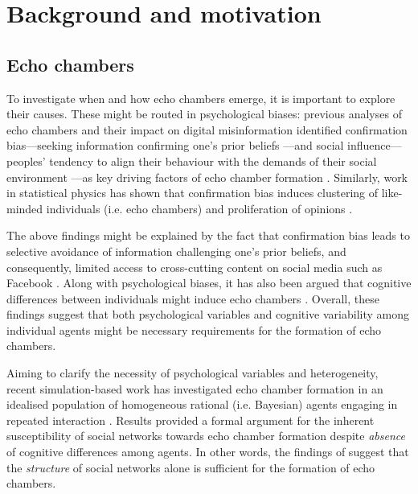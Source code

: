 \documentclass[fleqn,10pt]{wlscirep}
\begin{document}
\section*{Background and motivation}
\subsection*{Echo chambers}
To investigate when and how echo chambers emerge, it is important to explore their causes. These might be routed in psychological biases: previous analyses of echo chambers and their impact on digital misinformation identified confirmation bias---seeking information confirming one's prior beliefs \cite{nickerson1998confirmation}---and social influence---peoples' tendency to align their behaviour with the demands of their social environment \cite{kelman1958compliance}---as key driving factors of echo chamber formation
\cite{del2016spreading, starnini2016emergence, sikder2020minimalistic}. Similarly, work in statistical physics has shown that confirmation bias induces clustering of like-minded individuals (i.e. echo chambers) and proliferation of opinions \cite{ngampruetikorn2016bias}. 

The above findings might be explained by the fact that confirmation bias leads to selective avoidance of information challenging one's prior beliefs, and consequently, limited access to cross-cutting content on social media such as Facebook \cite{bakshy2015exposure, ngampruetikorn2016bias}. Along with psychological biases, it has also been argued that cognitive differences between individuals might induce echo chambers \cite{barkun2013culture}. Overall, these findings suggest that both psychological variables and cognitive variability among individual agents might be necessary requirements for the formation of echo chambers.

Aiming to clarify the necessity of psychological variables and heterogeneity, recent simulation-based work has investigated echo chamber formation in an idealised population of homogeneous rational (i.e. Bayesian) agents engaging in repeated interaction \cite{madsen2018large, madsen2017growing}. Results provided a formal argument for the inherent susceptibility of social networks towards echo chamber formation despite \emph{absence} of cognitive differences among agents. In other words, the findings of \cite{madsen2018large} suggest that the \textit{structure} of social networks alone is sufficient for the formation of echo chambers. 
\end{document}
